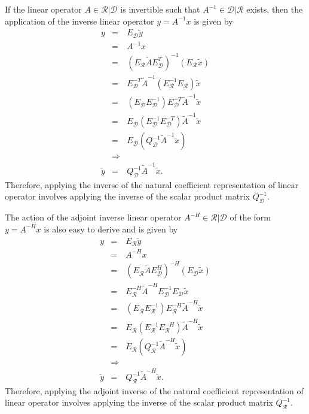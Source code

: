If the linear operator $A\in\mathcal{R}|\mathcal{D}$ is invertible such that
$A^{-1}\in\mathcal{D}|\mathcal{R}$ exists, then the application of the inverse
linear operator $y = A^{-1} x$ is given by
%
\begin{eqnarray}
y
& = & E_{\mathcal{D}} \tilde{y} \nonumber \\
& = & A^{-1} x \nonumber \\
& = & (E_{\mathcal{R}} \tilde{A} E_{\mathcal{D}}^T)^{-1} (E_{\mathcal{R}} \tilde{x}) \nonumber \\
& = & E_{\mathcal{D}}^{-T} \tilde{A}^{-1} (E_{\mathcal{R}}^{-1} E_{\mathcal{R}}) \tilde{x}  \nonumber \\
& = & ( E_{\mathcal{D}} E_{\mathcal{D}}^{-1} ) E_{\mathcal{D}}^{-T} \tilde{A}^{-1} \tilde{x}  \nonumber \\
& = & E_{\mathcal{D}} (E_{\mathcal{D}}^{-1} E_{\mathcal{D}}^{-T}) \tilde{A}^{-1} \tilde{x}  \nonumber \\
& = & E_{\mathcal{D}} ( Q_{\mathcal{D}}^{-1} \tilde{A}^{-1} \tilde{x} ) \nonumber \\
& \Rightarrow &  \nonumber \\
\tilde{y} & = & Q_{\mathcal{D}}^{-1} \tilde{A}^{-1} \tilde{x}.
\label{eqn:A_natural_matrix_inverse_apply}
\end{eqnarray}
%
Therefore, applying the inverse of the natural coefficient representation of
linear operator involves applying the inverse of the scalar product matrix
$Q_{\mathcal{D}}^{-1}$.

The action of the adjoint inverse linear operator
$A^{-H}\in\mathcal{R}|\mathcal{D}$ of the form $y = A^{-H} x$ is also easy to
derive and is given by
%
\begin{eqnarray}
y
& = & E_{\mathcal{R}} \tilde{y} \nonumber \\
& = & A^{-H} x \nonumber \\
& = & (E_{\mathcal{R}} \tilde{A} E_{\mathcal{D}}^H)^{-H} (E_{\mathcal{D}} \tilde{x}) \nonumber \\
& = & E_{\mathcal{R}}^{-H} \tilde{A}^{-H} E_{\mathcal{D}}^{-1} E_{\mathcal{D}} \tilde{x}  \nonumber \\
& = & ( E_{\mathcal{R}} E_{\mathcal{R}}^{-1} ) E_{\mathcal{R}}^{-H} \tilde{A}^{-H} \tilde{x}  \nonumber \\
& = & E_{\mathcal{R}} (E_{\mathcal{R}}^{-1} E_{\mathcal{R}}^{-H}) \tilde{A}^{-H} \tilde{x}  \nonumber \\
& = & E_{\mathcal{R}} ( Q_{\mathcal{R}}^{-1} \tilde{A}^{-H} \tilde{x} ) \nonumber \\
& \Rightarrow &  \nonumber \\
\tilde{y} & = & Q_{\mathcal{R}}^{-1} \tilde{A}^{-H} \tilde{x}.
\label{eqn:A_natural_matrix_adjoint_inverse_apply}
\end{eqnarray}
%
Therefore, applying the adjoint inverse of the natural coefficient
representation of linear operator involves applying the inverse of the scalar
product matrix $Q_{\mathcal{R}}^{-1}$.

